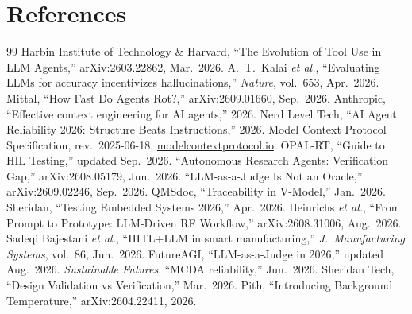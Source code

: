 \documentclass[11pt,a4paper]{article}
\begin{document}
\section*{References}
\label{sec:references}

\begin{thebibliography}{99}\small
{} Harbin Institute of Technology \& Harvard, ``The Evolution of Tool Use in LLM Agents,'' arXiv:2603.22862, Mar.\ 2026.
 A.\ T.\ Kalai \emph{et al.}, ``Evaluating LLMs for accuracy incentivizes hallucinations,'' \emph{Nature}, vol.\ 653, Apr.\ 2026.
 Mittal, ``How Fast Do Agents Rot?,'' arXiv:2609.01660, Sep.\ 2026.
 Anthropic, ``Effective context engineering for AI agents,'' 2026.
 Nerd Level Tech, ``AI Agent Reliability 2026: Structure Beats Instructions,'' 2026.
 Model Context Protocol Specification, rev.\ 2025-06-18, \url{modelcontextprotocol.io}.
 OPAL-RT, ``Guide to HIL Testing,'' updated Sep.\ 2026.
 ``Autonomous Research Agents: Verification Gap,'' arXiv:2608.05179, Jun.\ 2026.
 ``LLM-as-a-Judge Is Not an Oracle,'' arXiv:2609.02246, Sep.\ 2026.
 QMSdoc, ``Traceability in V-Model,'' Jan.\ 2026.
 Sheridan, ``Testing Embedded Systems 2026,'' Apr.\ 2026.
 Heinrichs \emph{et al.}, ``From Prompt to Prototype: LLM-Driven RF Workflow,'' arXiv:2608.31006, Aug.\ 2026.
 Sadeqi Bajestani \emph{et al.}, ``HITL+LLM in smart manufacturing,'' \emph{J.\ Manufacturing Systems}, vol.\ 86, Jun.\ 2026.
 FutureAGI, ``LLM-as-a-Judge in 2026,'' updated Aug.\ 2026.
 \emph{Sustainable Futures}, ``MCDA reliability,'' Jun.\ 2026.
 Sheridan Tech, ``Design Validation vs Verification,'' Mar.\ 2026.
 Pith, ``Introducing Background Temperature,'' arXiv:2604.22411, 2026.
\end{thebibliography}
\end{document}
